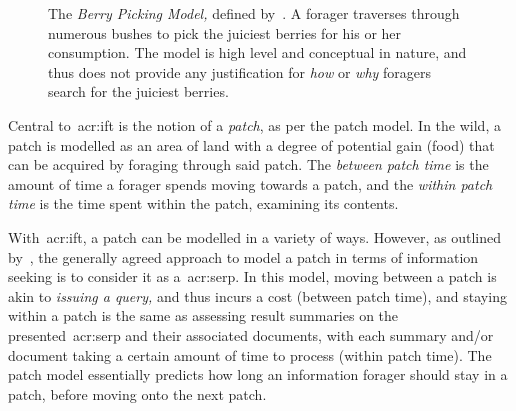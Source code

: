 \begin{figure}[t!]
    \centering
    \caption[The Berry Picking Model~\cite{bates1989berry_picking}]{The \emph{Berry Picking Model,} defined by~\cite{bates1989berry_picking}. A forager traverses through numerous bushes to pick the juiciest berries for his or her consumption. The model is high level and conceptual in nature, and thus does not provide any justification for \emph{how} or \emph{why} foragers search for the juiciest berries.}
    \label{fig:berry_picking}
\end{figure}

Central to~\gls{acr:ift} is the notion of a \emph{patch}, as per the patch model. In the wild, a patch is modelled as an area of land with a degree of potential gain (food) that can be acquired by foraging through said patch. The \emph{between patch time} is the amount of time a forager spends moving towards a patch, and the \emph{within patch time} is the time spent within the patch, examining its contents.

With~\gls{acr:ift}, a patch can be modelled in a variety of ways. However, as outlined by~\cite{azzopardi2015theories}, the generally agreed approach to model a patch in terms of information seeking is to consider it as a~\gls{acr:serp}. In this model, moving between a patch is akin to \emph{issuing a query,} and thus incurs a cost (between patch time), and staying within a patch is the same as assessing result summaries on the presented~\gls{acr:serp} and their associated documents, with each summary and/or document taking a certain amount of time to process (within patch time). The patch model essentially predicts how long an information forager should stay in a patch, before moving onto the next patch.

